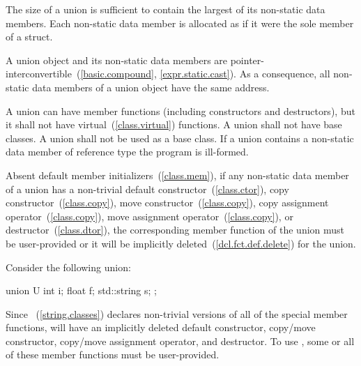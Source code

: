 \pnum
The size of a union is sufficient to contain the largest
of its non-static data members. Each non-static data member is allocated
as if it were the sole member of a struct.
\begin{note}
A union object and its non-static data members are
pointer-interconvertible~(\ref{basic.compound}, \ref{expr.static.cast}).
As a consequence, all non-static data members of a
union object have the same address.
\end{note}

\pnum
{}%
%
%
A union can have member functions (including constructors and destructors),
%
but it shall not have virtual~(\ref{class.virtual}) functions. A union shall not have
base classes. A union shall not be used as a base class.
%
If a union contains a non-static data member of
reference type the program is ill-formed.
\begin{note} Absent default member initializers~(\ref{class.mem}),
if any non-static data member of a union has a non-trivial
default constructor~(\ref{class.ctor}),
copy constructor~(\ref{class.copy}),
move constructor~(\ref{class.copy}),
copy assignment operator~(\ref{class.copy}),
move assignment operator~(\ref{class.copy}),
or destructor~(\ref{class.dtor}), the corresponding member function
of the union must be user-provided or it will
be implicitly deleted~(\ref{dcl.fct.def.delete}) for the union. \end{note}

\pnum
\begin{example} Consider the following union:

\begin{codeblock}
union U {
  int i;
  float f;
  std::string s;
};
\end{codeblock}

Since ~(\ref{string.classes}) declares non-trivial versions of all of the special
member functions,  will have an implicitly deleted default constructor,
copy/move constructor,
copy/move assignment operator, and destructor.
To use , some or all of these member functions
must be user-provided.\end{example}

